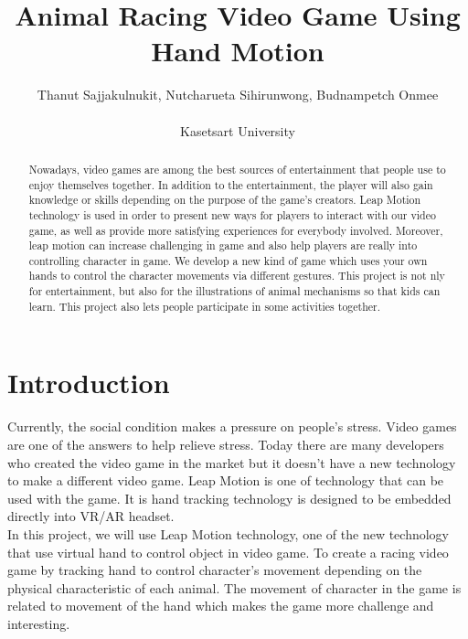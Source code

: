 \documentclass[journal]{IEEEtran}										    %
\title{\textbf{Animal Racing Video Game Using Hand Motion}}
\author{Thanut Sajjakulnukit, Nutcharueta Sihirunwong, Budnampetch Onmee \\ \\
    \Large Kasetsart University }
\begin{document}
    \maketitle														        %
    \begin{abstract}                                                        %
        Nowadays, video games are among the best sources of 
        entertainment that people use to enjoy themselves together.
        In addition to the entertainment, the player will also gain 
        knowledge or skills depending on the purpose of the game’s 
        creators. Leap Motion technology is used in order to 
        present new ways for players to interact with our video 
        game, as well as provide more satisfying experiences for 
        everybody involved. Moreover, leap motion can increase 
        challenging in game and also help players are really into 
        controlling character in game. We  develop a new kind of 
        game which uses your own hands to control the character 
        movements via different gestures. This project is not 
        nly for entertainment, but also for the illustrations 
        of animal mechanisms so that kids can learn. This 
        project also lets people participate in some 
        activities together.

    \end{abstract}

    \section{Introduction}                                                  %
    Currently, the social condition makes a pressure on people’s 
    stress. Video games are one of the answers to help relieve 
    stress. Today there are many developers who created the video 
    game in the market but it doesn't have a new technology to make 
    a different video game. Leap Motion is one of technology that 
    can be used with the game. It is hand tracking technology is 
    designed to be embedded directly into VR/AR headset. \\

    In this project, we will use Leap Motion technology, one of
    the new technology that use virtual hand to control object
    in video game. To create a racing video game by tracking 
    hand to control character’s movement depending on the 
    physical characteristic of each animal. The movement of 
    character in the game is related to movement of the hand 
    which makes the game more challenge and interesting.
    
\end{document}
